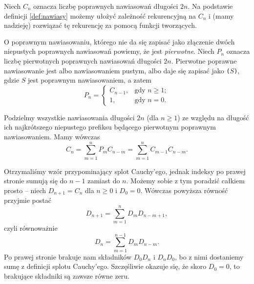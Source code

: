 \documentclass[shortabstract]{imthesis}
\begin{document}
    Niech $C_n$ oznacza liczbę poprawnych nawiasowań długości $2n$. Na podstawie definicji \ref{def:nawiasy} możemy ułożyć zależność rekurencyjną na $C_n$ i (mamy nadzieję) rozwiązać tę rekurencję za pomocą funkcji tworzących.

    O poprawnym nawiasowaniu, którego nie da się zapisać jako złączenie dwóch niepustych poprawnych nawiasowań powiemy, że jest \emph{pierwotne}. Niech $P_n$ oznacza liczbę pierwotnych poprawnych nawiasowań długości $2n$. Pierwotne poprawne nawiasowanie jest albo nawiasowaniem pustym, albo daje się zapisać jako \texttt{(}$S$\texttt{)}, gdzie $S$ jest poprawnym nawiasowaniem, a zatem
    $$
    P_n = \begin{cases} C_{n-1}, &\text{gdy $n \geq 1$}; \\ 1, &\text{gdy $n = 0$.} \end{cases}
    $$
    
    Podzielmy wszystkie nawiasowania długości $2n$ (dla $n \geq 1$) ze względu na długość ich najkrótszego niepustego prefiksu będącego pierwotnym poprawnym nawiasowaniem. Mamy wówczas
    $$
    C_n = \sum_{m=1}^n P_m C_{n-m} = \sum_{m=1}^n C_{m-1}C_{n-m}.
    $$

    Otrzymaliśmy wzór przypominający splot Cauchy'ego, jednak indeksy po prawej stronie sumują się do $n-1$ zamiast do $n$. Możemy sobie z tym poradzić całkiem prosto -- niech $D_{n+1} = C_n$ dla $n \geq 0$ i $D_0 = 0$. Wówczas powyższa równość przyjmie postać
    $$
    D_{n+1} = \sum_{m=1}^n D_mD_{n-m+1},
    $$
    czyli równoważnie
    $$
    D_n = \sum_{m=1}^{n-1} D_mD_{n-m}.
    $$
    Po prawej stronie brakuje nam składników $D_0D_n$ i $D_nD_0$, bo z nimi dostaniemy sumę z definicji splotu Cauchy'ego. Szczęśliwie okazuje się, że skoro $D_0 = 0$, to brakujące składniki są zawsze równe zeru. 
    
\end{document}
